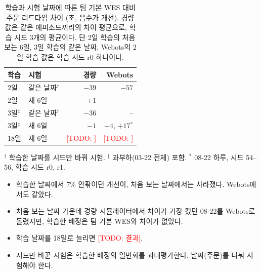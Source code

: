 \documentclass[conference]{IEEEtran}
\newcommand{\todo}[1]{\textcolor{red}{[TODO: #1]}}
\begin{document}
\begin{table}[t]
\centering
\caption{학습과 시험 날짜에 따른 팀 기본 WES 대비 주문 리드타임 차이 (초, 음수가 개선). 경량 값은 같은 에피소드끼리의 차이 평균으로, 학습 시드 3개의 평균이다. 단 2일 학습의 처음 보는 6일, 3일 학습의 같은 날짜, Webots의 2일 학습 값은 학습 시드 r0 하나이다.} %
\label{tab:overfit}
\small
\begin{tabular}{@{}llrr@{}}
\toprule
학습 & 시험 & 경량 & Webots \\
\midrule
2일 & 같은 날짜$^\dagger$ & $-39$ & $-57$ \\
2일 & 새 6일 & $+1$ & -- \\
3일$^\ddagger$ & 같은 날짜$^\dagger$ & $-36$ & -- \\
3일$^\ddagger$ & 새 6일 & $-1$ & $+4$, $+17$$^\ast$ \\
18일 & 새 6일 & \todo{} & \todo{} \\
\bottomrule
\end{tabular}

\vspace{2pt}
\footnotesize $^\dagger$ 학습한 날짜를 시드만 바꿔 시험. $^\ddagger$ 과부하(03-22 전체) 포함. $^\ast$ 08-22 하루, 시드 54--56, 학습 시드 r0, r1.
\end{table}

\begin{itemize}
  \item 학습한 날짜에서 7\% 안팎이던 개선이, 처음 보는 날짜에서는 사라졌다. Webots에서도 같았다.
  \item 처음 보는 날짜 가운데 경량 시뮬레이터에서 차이가 가장 컸던 08-22를 Webots로 돌렸지만, 학습한 배정은 팀 기본 WES와 차이가 없었다.
  \item 학습 날짜를 18일로 늘리면 \todo{결과}.
  \item 시드만 바꾼 시험은 학습한 배정의 일반화를 과대평가한다. 날짜(주문)를 나눠 시험해야 한다.
\end{itemize}

\end{document}
